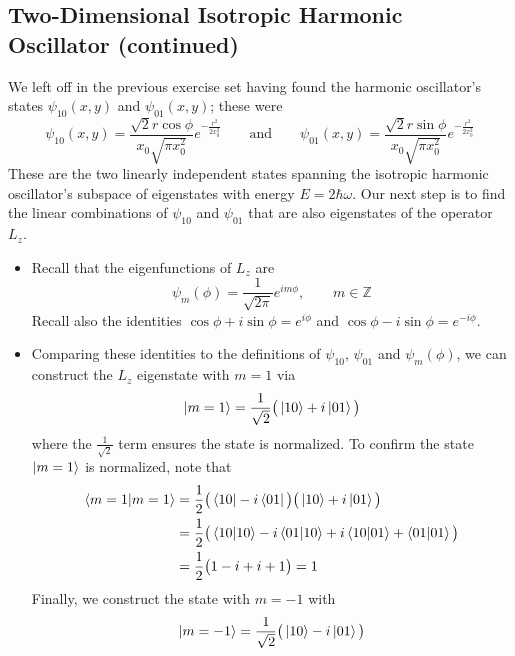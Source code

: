 \documentclass[11pt, a4paper]{article}
\newcommand{\eqtext}[1]{\qquad \text{#1} \qquad}
\begin{document}
\subsection{Two-Dimensional Isotropic Harmonic Oscillator (continued)}
We left off in the previous exercise set having found the harmonic oscillator's states $ \psi_{10}(x,y) $ and $ \psi_{01}(x, y) $; these were
\begin{equation*}
	\psi_{10}(x, y) = \frac{\sqrt{2}r \cos \phi}{x_{0}\sqrt{\pi x_{0}^{2}}}e^{-\frac{r^{2}}{2x_{0}^{2}}} \eqtext{and} \psi_{01}(x, y) = \frac{\sqrt{2}r \sin \phi}{x_{0}\sqrt{\pi x_{0}^{2}}}e^{-\frac{r^{2}}{2x_{0}^{2}}}
\end{equation*}
These are the two linearly independent states spanning the isotropic harmonic oscillator's subspace of eigenstates with energy $ E = 2\hbar \omega $. Our next step is to find the linear combinations of $ \psi_{10} $ and $ \psi_{01} $ that are also eigenstates of the operator $ L_{z} $. 
	
\vspace{2mm}
\begin{itemize}
	\item Recall that the eigenfunctions of $ L_{z} $ are 
	\begin{equation*}
		\psi_{m}(\phi) = \frac{1}{\sqrt{2\pi}}e^{im\phi}, \qquad m \in \mathbb{Z}
	\end{equation*}
	Recall also the identities $ \cos \phi + i \sin \phi = e^{i\phi} $ and $ \cos \phi - i \sin \phi = e^{-i\phi} $. 
	
	\item Comparing these identities to the definitions of $ \psi_{10} $, $ \psi_{01} $ and $ \psi_{m}(\phi) $, we can construct the $ L_{z} $ eigenstate with $ m = 1 $ via
	\begin{equation*}
		\ket{m=1} = \frac{1}{\sqrt{2}}\big(\ket{10} + i\ket{01}\big)
	\end{equation*}
	where the $ \frac{1}{\sqrt{2}} $ term ensures the state is normalized. To confirm the state $ \ket{m=1} $ is normalized, note that
	\begin{align*}
		\braket{m=1}{m=1} &= \frac{1}{2}\big(\bra{10} - i\bra{01}\big)\big(\ket{10} + i\ket{01}\big)\\
		&= \frac{1}{2}\big(\braket{10}{10} - i \braket{01}{10} + i\braket{10}{01} + \braket{01}{01}\big)\\
		&=\frac{1}{2}\big(1 -i + i + 1\big) = 1
	\end{align*}
	Finally, we construct the state with $ m = -1 $ with
	\begin{equation*}
		\ket{m=-1} = \frac{1}{\sqrt{2}} \big(\ket{10} - i \ket{01}\big)
	\end{equation*}
	
\end{itemize}
\end{document}
